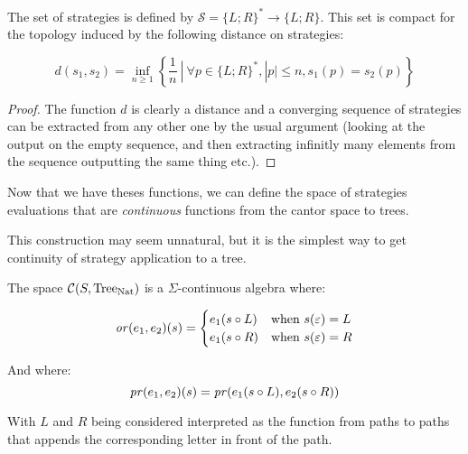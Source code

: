 \begin{adefinition}[Strategies]
     The set of strategies is 
     defined by $\mathcal{S} = \{ L;R\}^* \to \{ L; R\}$.
     This set is compact for the topology induced by the 
     following distance on strategies:

     \begin{equation*}
         d(s_1,s_2) = \inf_{n \geq 1} \left\{ \frac{1}{n} ~|~ \forall p \in \{ L;R\}^*,
                                         |p| \leq n, s_1(p) = s_2(p) \right\}
     \end{equation*}
\end{adefinition}

\begin{proof}
    The function $d$ is clearly a distance and a converging sequence 
    of strategies can be extracted from any other one by the usual argument 
    (looking at the output on the empty sequence, and then extracting
    infinitly many elements from the sequence outputting the same thing etc.).
\end{proof}

Now that we have theses functions, we can define the space 
of strategies evaluations that are \emph{continuous}
functions from the cantor space to trees. 

This construction may seem unnatural, but it is the simplest 
way to get continuity of strategy application to a tree.

\begin{adefinition}
    The space $\mathcal{C}(S,\textnormal{Tree}_{\textnormal{Nat}})$ is a $\Sigma$-continuous 
    algebra where:

    \begin{equation*}
        \operatorname{\mathit{or}} (e_1,e_2) (s) = 
        \begin{cases}
            e_1 (s \circ L) & \text{when } s(\varepsilon) = L \\
            e_1 (s \circ R) & \text{when } s(\varepsilon) = R 
        \end{cases}
    \end{equation*}

    And where:
    \begin{equation*}
        \operatorname{\mathit{pr}} (e_1,e_2) (s) = \operatorname{\mathit{pr}} (e_1 (s \circ L), e_2 (s \circ R)) 
    \end{equation*}

    With $L$ and $R$ being considered interpreted as the function 
    from paths to paths that appends the corresponding letter in front of 
    the path.
\end{adefinition}

